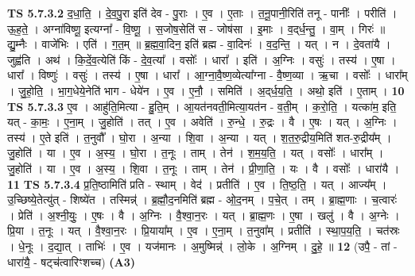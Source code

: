 \documentclass[17pt]{extarticle}
\begin{document}
                  \newline
                                \textbf{ TS 5.7.3.2} \newline
                  द॒धा॒ति॒ । दे॒व॒पु॒रा इति॑ देव - पु॒राः । ए॒व । ए॒ताः । त॒नू॒पानी॒रिति॑ तनू - पानीः᳚ । परीति॑ । ऊ॒ह॒ते॒ । अग्ना॑विष्णू॒ इत्यग्ना᳚ - वि॒ष्णू॒ । स॒जोष॒सेति॑ स - जोष॑सा । इ॒माः । व॒द्‌र्ध॒न्तु॒ । वा॒म् । गिरः॑ ॥ द्यु॒म्नैः । वाजे॑भिः । एति॑ । ग॒त॒म् ॥ ब्र॒ह्म॒वा॒दिन॒ इति॑ ब्रह्म - वा॒दिनः॑ । व॒द॒न्ति॒ । यत् । न । दे॒वता॑यै । जुह्व॑ति । अथ॑ । कि॒दें॒व॒त्येति॑ किं - दे॒व॒त्या᳚ । वसोः᳚ । धारा᳚ । इति॑ । अ॒ग्निः । वसुः॑ । तस्य॑ । ए॒षा । धारा᳚ । विष्णुः॑ । वसुः॑ । तस्य॑ । ए॒षा । धारा᳚ । आ॒ग्ना॒वै॒ष्ण॒व्येत्या᳚ग्ना - वै॒ष्ण॒व्या । ऋ॒चा । वसोः᳚ । धारा᳚म् । जु॒हो॒ति॒ । भा॒ग॒धेये॒नेति॑ भाग - धेये॑न । ए॒व । ए॒नौ॒ । समिति॑ । अ॒द्‌र्ध॒य॒ति॒ । अथो॒ इति॑ । ए॒ताम् । \textbf{  10} \newline
                  \newline
                                \textbf{ TS 5.7.3.3} \newline
                  ए॒व । आहु॑ति॒मित्या - हु॒ति॒म् । आ॒यत॑नवती॒मित्या॒यत॑न - व॒ती॒म् । क॒रो॒ति॒ । यत्का॑म॒ इति॒ यत् - का॒मः॒ । ए॒ना॒म् । जु॒होति॑ । तत् । ए॒व । अवेति॑ । रु॒न्धे॒ । रु॒द्रः । वै । ए॒षः । यत् । अ॒ग्निः । तस्य॑ । ए॒ते इति॑ । त॒नुवौ᳚ । घो॒रा । अ॒न्या । शि॒वा । अ॒न्या । यत् । श॒त॒रु॒द्रीय॒मिति॑ शत-रु॒द्रीय᳚म् । जु॒होति॑ । या । ए॒व । अ॒स्य॒ । घो॒रा । त॒नूः । ताम् । तेन॑ । श॒म॒य॒ति॒ । यत् । वसोः᳚ । धारा᳚म् । जु॒होति॑ । या । ए॒व । अ॒स्य॒ । शि॒वा । त॒नूः । ताम् । तेन॑ । प्री॒णा॒ति॒ । यः । वै । वसोः᳚ । धारा॑यै । \textbf{  11} \newline
                  \newline
                                \textbf{ TS 5.7.3.4} \newline
                  प्र॒ति॒ष्ठामिति॑ प्रति - स्थाम् । वेद॑ । प्रतीति॑ । ए॒व । ति॒ष्ठ॒ति॒ । यत् । आज्य᳚म् । उ॒च्छिष्ये॒तेत्यु॑त् - शिष्ये॑त । तस्मिन्न्॑ । ब्र॒ह्मौ॒द॒नमिति॑ ब्रह्म - ओ॒द॒नम् । प॒चे॒त् । तम् । ब्रा॒ह्म॒णाः । च॒त्वारः॑ । प्रेति॑ । अ॒श्नी॒युः॒ । ए॒षः । वै । अ॒ग्निः । वै॒श्वा॒न॒रः । यत् । ब्रा॒ह्म॒णः । ए॒षा । खलु॑ । वै । अ॒ग्नेः । प्रि॒या । त॒नूः । यत् । वै॒श्वा॒न॒रः । प्रि॒याया᳚म् । ए॒व । ए॒ना॒म् । त॒नुवा᳚म् । प्रतीति॑ । स्था॒प॒य॒ति॒ । चत॑स्रः । धे॒नूः । द॒द्या॒त् । ताभिः॑ । ए॒व । यज॑मानः । अ॒मुष्मिन्न्॑ । लो॒के । अ॒ग्निम् । दु॒हे॒ ॥ \textbf{  12} \newline
                  \newline
                      (उपै॒ - तां - धारा॑यै॒ - षट्च॑त्वारिꣳशच्च)  \textbf{(A3)} \newline \newline
\end{document}

